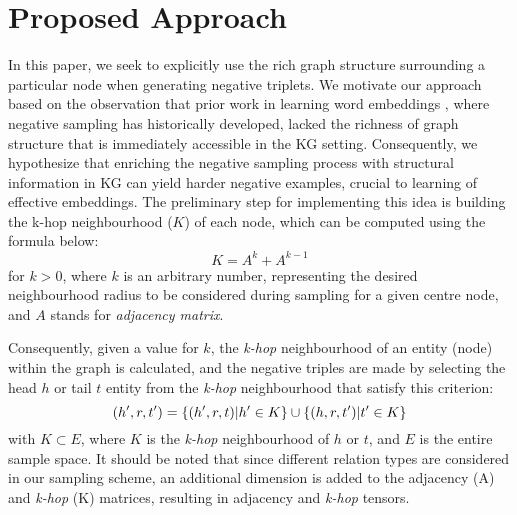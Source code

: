 \section{Proposed Approach}
\label{sec:proposedapproach}
In this paper, we seek to explicitly use the rich graph structure surrounding a particular node when generating negative triplets. We motivate our approach based on the observation that prior work in learning word embeddings \cite{mikolov2013distributed}, where negative sampling has historically developed, lacked the richness of graph structure that is immediately accessible in the KG setting. Consequently, we hypothesize that enriching the negative sampling process with structural information in KG can yield harder negative examples, crucial to learning of effective embeddings. The preliminary step for implementing this idea is building the k-hop neighbourhood ($K$) of each node, which can be computed using the formula below: 
\begin{equation}
\label{eqn:khop}
K = A^{k} + A^{k-1}
\end{equation}
for $k>0$, where $k$ is an arbitrary number, representing the desired neighbourhood radius to be considered during sampling for a given centre node, and $A$ stands for \emph{adjacency matrix}. 

Consequently, given a value for $k$, the \emph{k-hop} neighbourhood of an entity (node) within the graph is calculated, and the negative triples are made by selecting the head $h$ or tail $t$ entity from the \emph{k-hop} neighbourhood that satisfy this criterion:
\begin{equation}
    (h',r,t') = \{ (h',r,t)|h'\in K\} \cup \{(h,r,t')|t'\in K \}  \\
\end{equation}
with $ K \subset E$, where $K$ is the \emph{k-hop} neighbourhood of $h$ or $t$, and $E$ is the entire sample space. It should be noted that since different relation types are considered in our sampling scheme, an additional dimension is added to the adjacency (A) and \emph{k-hop} (K) matrices, resulting in adjacency and \emph{k-hop} tensors.

